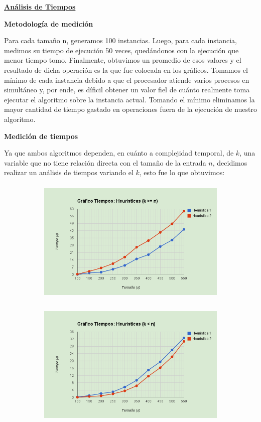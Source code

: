 \documentclass[10pt,a4paper]{article}
\begin{document}
\noindent \textbf{\underline{Análisis de Tiempos}}

\noindent \textbf{Metodología de medición}

Para cada tamaño n, generamos 100 instancias. Luego, para cada instancia, medimos su tiempo de ejecución 50 veces, quedándonos con la ejecución que menor tiempo tomo. Finalmente, obtuvimos un promedio de esos valores y el resultado de dicha operación es la que fue colocada en los gráficos. Tomamos el mínimo de cada instancia debido a que el procesador atiende varios procesos en simultáneo y, por ende, es díficil obtener un valor fiel de cuánto realmente toma ejecutar el algoritmo sobre la instancia actual. Tomando el mínimo eliminamos la mayor cantidad de tiempo gastado en operaciones fuera de la ejecución de nuestro algoritmo.

\noindent \textbf{Medición de tiempos}

Ya que ambos algoritmos dependen, en cuánto a complejidad temporal, de $k$, una variable que no tiene relación directa con el tamaño de la entrada $n$, decidimos realizar un análisis de tiempos variando el $k$, esto fue lo que obtuvimos:

\begin{figure}[h!]
\begin{subfigure}{0.5\textwidth}
	\includegraphics[width=\textwidth, height=60mm]{grafico_tiempos_heuristicas_kmayorigualn.png}
\end{subfigure}
\begin{subfigure}{0.5\textwidth}
	\includegraphics[width=\textwidth, height=60mm]{grafico_tiempos_heuristicas_kmenorn.png}
\end{subfigure}
\end{figure}
\end{document}

